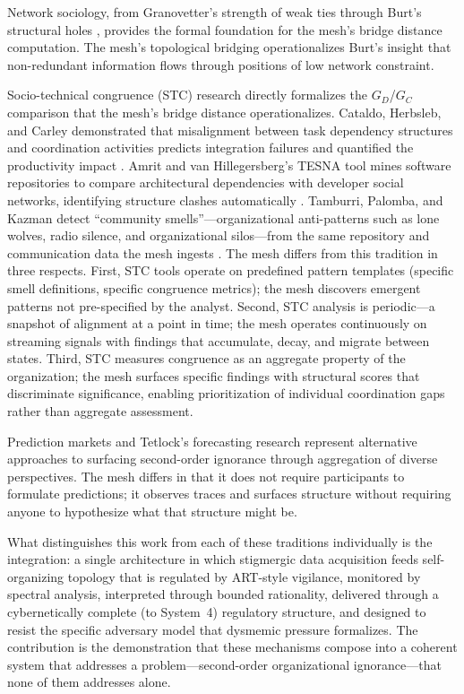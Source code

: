 \documentclass[11pt,a4paper]{article}
\begin{document}
Network sociology, from Granovetter's strength of weak ties \citep{granovetter1973} through Burt's structural holes \citep{burt2004}, provides the formal foundation for the mesh's bridge distance computation. The mesh's topological bridging operationalizes Burt's insight that non-redundant information flows through positions of low network constraint.

Socio-technical congruence (STC) research directly formalizes the $G_D$/$G_C$ comparison that the mesh's bridge distance operationalizes. Cataldo, Herbsleb, and Carley demonstrated that misalignment between task dependency structures and coordination activities predicts integration failures and quantified the productivity impact \citep{cataldo2008}. Amrit and van Hillegersberg's TESNA tool mines software repositories to compare architectural dependencies with developer social networks, identifying structure clashes automatically \citep{amrit2010}. Tamburri, Palomba, and Kazman detect ``community smells''---organizational anti-patterns such as lone wolves, radio silence, and organizational silos---from the same repository and communication data the mesh ingests \citep{tamburri2021}. The mesh differs from this tradition in three respects. First, STC tools operate on predefined pattern templates (specific smell definitions, specific congruence metrics); the mesh discovers emergent patterns not pre-specified by the analyst. Second, STC analysis is periodic---a snapshot of alignment at a point in time; the mesh operates continuously on streaming signals with findings that accumulate, decay, and migrate between states. Third, STC measures congruence as an aggregate property of the organization; the mesh surfaces specific findings with structural scores that discriminate significance, enabling prioritization of individual coordination gaps rather than aggregate assessment.

Prediction markets and Tetlock's forecasting research \citep{tetlock2005} represent alternative approaches to surfacing second-order ignorance through aggregation of diverse perspectives. The mesh differs in that it does not require participants to formulate predictions; it observes traces and surfaces structure without requiring anyone to hypothesize what that structure might be.

What distinguishes this work from each of these traditions individually is the integration: a single architecture in which stigmergic data acquisition feeds self-organizing topology that is regulated by ART-style vigilance, monitored by spectral analysis, interpreted through bounded rationality, delivered through a cybernetically complete (to System~4) regulatory structure, and designed to resist the specific adversary model that dysmemic pressure formalizes. The contribution is the demonstration that these mechanisms compose into a coherent system that addresses a problem---second-order organizational ignorance---that none of them addresses alone.
\end{document}
